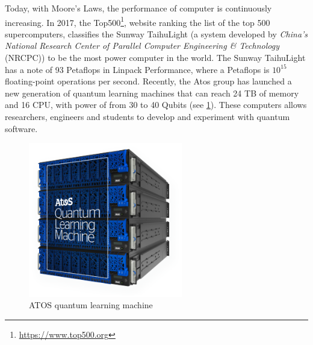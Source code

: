 Today, with Moore's Laws, the performance of computer is continuously increasing. In 2017, the Top500\footnote{\url{https://www.top500.org}}, website ranking the list of the top 500 supercomputers, classifies the Sunway TaihuLight (a system developed by \textit{China's National Research Center of Parallel Computer Engineering \& Technology} (NRCPC)) to be the most power computer in the world. The Sunway TaihuLight has a note of 93 Petaflops in Linpack Performance, where a Petaflops is $10^{15}$ floating-point operations per second. Recently, the Atos group has launched a new generation of quantum learning machines that can reach 24 TB of memory and 16 CPU, with power of from 30 to 40 Qubits (see \ref{qlm}). These computers allows researchers, engineers and students to develop and experiment with quantum software.   
\begin{figure}[!h]
\centering 
\includegraphics[width=0.6\textwidth]{images/qlm.png}
\caption{ATOS quantum learning machine}
\label{qlm} 
\end{figure}
